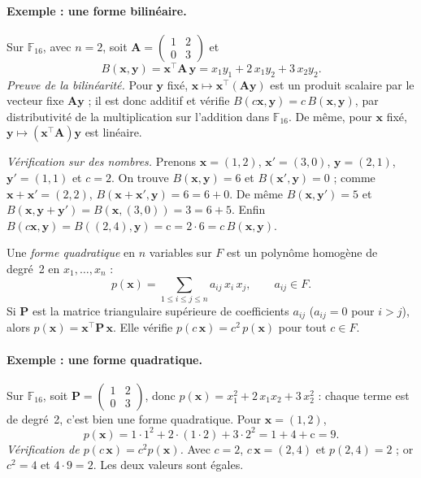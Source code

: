 \paragraph{Exemple : une forme bilinéaire.} Sur $\mathbb{F}_{16}$, avec $n=2$, soit $\mathbf{A}=\begin{pmatrix}1&2\\0&3\end{pmatrix}$ et
\[B(\mathbf{x},\mathbf{y})=\mathbf{x}^{\top}\mathbf{A}\,\mathbf{y}=x_1y_1+2\,x_1y_2+3\,x_2y_2.\]
\emph{Preuve de la bilinéarité.} Pour $\mathbf{y}$ fixé, $\mathbf{x}\mapsto\mathbf{x}^{\top}(\mathbf{A}\mathbf{y})$ est un produit scalaire par le vecteur fixe $\mathbf{A}\mathbf{y}$ ; il est donc additif et vérifie $B(c\mathbf{x},\mathbf{y})=c\,B(\mathbf{x},\mathbf{y})$, par distributivité de la multiplication sur l'addition dans $\mathbb{F}_{16}$. De même, pour $\mathbf{x}$ fixé, $\mathbf{y}\mapsto(\mathbf{x}^{\top}\mathbf{A})\mathbf{y}$ est linéaire.

\emph{Vérification sur des nombres.} Prenons $\mathbf{x}=(1,2)$, $\mathbf{x}'=(3,0)$, $\mathbf{y}=(2,1)$, $\mathbf{y}'=(1,1)$ et $c=2$. On trouve $B(\mathbf{x},\mathbf{y})=6$ et $B(\mathbf{x}',\mathbf{y})=0$ ; comme $\mathbf{x}+\mathbf{x}'=(2,2)$, $B(\mathbf{x}+\mathbf{x}',\mathbf{y})=6=6+0$. De même $B(\mathbf{x},\mathbf{y}')=5$ et $B(\mathbf{x},\mathbf{y}+\mathbf{y}')=B(\mathbf{x},(3,0))=3=6+5$. Enfin $B(c\mathbf{x},\mathbf{y})=B((2,4),\mathbf{y})=\mathrm{c}=2\cdot6=c\,B(\mathbf{x},\mathbf{y})$.

\begin{definition}
Une \emph{forme quadratique} en $n$ variables sur $F$ est un polynôme homogène de degré~2 en $x_1,\dots,x_n$ :
\[p(\mathbf{x})=\sum_{1\le i\le j\le n}a_{ij}\,x_i\,x_j,\qquad a_{ij}\in F.\]
Si $\mathbf{P}$ est la matrice triangulaire supérieure de coefficients $a_{ij}$ ($a_{ij}=0$ pour $i>j$), alors $p(\mathbf{x})=\mathbf{x}^{\top}\mathbf{P}\,\mathbf{x}$. Elle vérifie $p(c\,\mathbf{x})=c^2\,p(\mathbf{x})$ pour tout $c\in F$.
\end{definition}

\paragraph{Exemple : une forme quadratique.} Sur $\mathbb{F}_{16}$, soit $\mathbf{P}=\begin{pmatrix}1&2\\0&3\end{pmatrix}$, donc $p(\mathbf{x})=x_1^2+2\,x_1x_2+3\,x_2^2$ : chaque terme est de degré~2, c'est bien une forme quadratique. Pour $\mathbf{x}=(1,2)$,
\[p(\mathbf{x})=1\cdot1^2+2\cdot(1\cdot2)+3\cdot2^2=1+4+\mathrm{c}=9.\]
\emph{Vérification de $p(c\,\mathbf{x})=c^2p(\mathbf{x})$.} Avec $c=2$, $c\,\mathbf{x}=(2,4)$ et $p(2,4)=2$ ; or $c^2=4$ et $4\cdot9=2$. Les deux valeurs sont égales.

